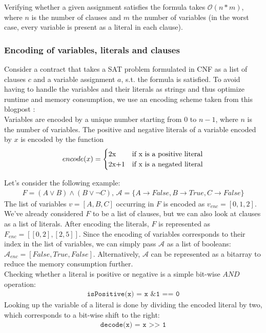 \documentclass{article}
\begin{document}
Verifying whether a given assignment satisfies the formula takes $\mathcal{O}(n*m)$, where $n$ is the number of clauses and $m$ the number of variables (in the worst case, every variable is present as a literal in each clause).

\subsubsection{Encoding of variables, literals and clauses}
Consider a contract that takes a SAT problem formulated in CNF as a list of clauses $c$ and a variable assignment $a$, s.t. the formula is satisfied. To avoid having to handle the variables and their literals as strings and thus optimize runtime and memory consumption, we use an encoding scheme taken from this blogpost \cite{sabablog}: \\
Variables are encoded by a unique number starting from $0$ to $n-1$, where $n$ is the number of variables. The positive and negative literals of a variable encoded by $x$ is encoded by the function
\begin{align*}
encode(x) =
\begin{cases}
  $2x$  & \text{if x is a positive literal}\\
  $2x+1$ & \text{if x is a negated literal}\\
\end{cases}   
\end{align*}

Let's consider the following example:
\begin{align*}
F = (A \vee B) \wedge (B \vee \neg C) \text{, } \mathcal{A} = \{A \rightarrow False, B \rightarrow True, C \rightarrow False\}
\end{align*}
The list of variables $v=[A,B,C]$ occurring in $F$ is encoded as $v_{enc} = [0,1,2]$. We've already considered $F$ to be a list of clauses, but we can also look at clauses as a list of literals. After encoding the literals, $F$ is represented as $F_{enc} = [[0,2],[2,5]]$. Since the encoding of variables corresponds to their index in the list of variables, we can simply pass $\mathcal{A}$ as a list of booleans: $\mathcal{A}_{enc} = [False, True, False]$. Alternatively, $\mathcal{A}$ can be represented as a bitarray to reduce the memory consumption further. \\
Checking whether a literal is positive or negative is a simple bit-wise $AND$ operation:
\begin{align*}
\texttt{isPositive(x) = x \& 1 == 0}
\end{align*}
Looking up the variable of a literal is done by dividing the encoded literal by two, which corresponds to a bit-wise shift to the right:
\begin{align*}
\texttt{decode(x) = x >> 1}
\end{align*}
\end{document}
